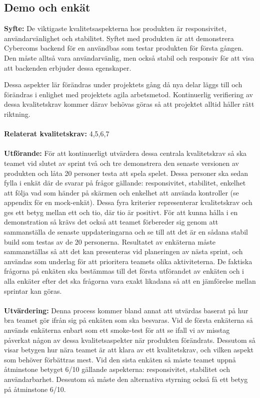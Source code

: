 \documentclass[10pt]{article}
\begin{document}
	\subsection{Demo och enkät}
	\textbf{Syfte:}	De viktigaste kvalitetsaspekterna hos produkten är responsivitet, användarvänlighet och stabilitet. Syftet med produkten är att demonstrera Cybercoms backend för en användbas som testar produkten för första gången. Den måste alltså vara användarvänlig, men också stabil och responsiv för att visa att backenden erbjuder dessa egenskaper.
	
	Dessa aspekter lär förändras under projektets gång då nya delar läggs till och förändras i enlighet med projektets agila arbetsmetod. Kontinuerlig verifiering av dessa kvalitetskrav kommer därav behövas göras så att projektet alltid håller rätt riktning.
	\\\\
	\textbf{Relaterat kvalitetskrav:} 4,5,6,7
	\\\\
	\textbf{Utförande:} För att kontinuerligt utvärdera dessa centrala kvalitetskrav så ska teamet vid slutet av sprint två och tre demonstrera den senaste versionen av produkten och låta 20 personer testa att spela spelet. Dessa personer ska sedan fylla i enkät där de svarar på frågor gällande: responsivitet, stabilitet, enkelhet att följa vad som händer på skärmen och enkelhet att använda kontroller (se appendix för en mock-enkät). Dessa fyra kriterier representerar kvalitetskrav och ges ett betyg mellan ett och tio, där tio är positivt. För att kunna hålla i en demonstration så krävs det också att teamet förbereder sig genom att sammanställa de senaste uppdateringarna och se till att det är en sådana stabil build som testas av de 20 personerna. Resultatet av enkäterna måste sammanställas så att det kan presenteras vid planeringen av nästa sprint, och användas som underlag för att prioritera teamets olika aktiviteterna. De faktiska frågorna på enkäten ska bestämmas till det första utförandet av enkäten och i alla enkäter efter det ska frågorna vara exakt likadana så att en jämförelse mellan sprintar kan göras.
	\\\\
	\textbf{Utvärdering:} Denna process kommer bland annat att utvärdas baserat på hur bra teamet gör ifrån sig på enkäten som ska besvaras. Vid de första enkäterna så används enkäterna enbart som ett smoke-test för att se ifall vi av misstag påverkat någon av dessa kvalitetsaspekter när produkten förändrats. Dessutom så visar betygen hur nära teamet är att klara av ett kvalitetskrav, och vilken aspekt som behöver förbättras mest. Vid den sista enkäten så måste teamet uppnå åtminstone betyget 6/10 gällande aspekterna: responsivitet, stabilitet och användarbarhet. Dessutom så måste den alternativa styrning också få ett betyg på åtminstone 6/10.
\end{document}
